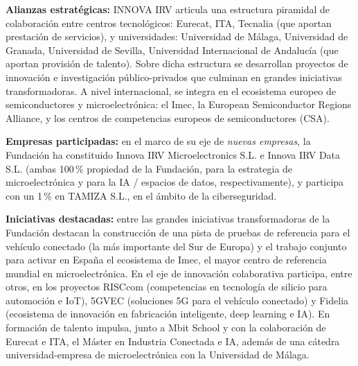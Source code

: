 \textbf{Alianzas estratégicas:} INNOVA IRV articula una estructura piramidal de colaboración entre centros tecnológicos: Eurecat, ITA, Tecnalia (que aportan prestación de servicios), y universidades: Universidad de Málaga, Universidad de Granada, Universidad de Sevilla, Universidad Internacional de Andalucía (que aportan provisión de talento). Sobre dicha estructura se desarrollan proyectos de innovación e investigación público-privados que culminan en grandes iniciativas transformadoras. A nivel internacional, se integra en el ecosistema europeo de semiconductores y microelectrónica: el Imec, la European Semiconductor Regions Alliance, y los centros de competencias europeos de semiconductores (CSA).

\textbf{Empresas participadas:} en el marco de su eje de \emph{nuevas empresas}, la Fundación ha constituido Innova IRV Microelectronics S.L. e Innova IRV Data S.L. (ambas 100\,\% propiedad de la Fundación, para la estrategia de microelectrónica y para la IA / espacios de datos, respectivamente), y participa con un 1\,\% en TAMIZA S.L., en el ámbito de la ciberseguridad.

\textbf{Iniciativas destacadas:} entre las grandes iniciativas transformadoras de la Fundación destacan la construcción de una pista de pruebas de referencia para el vehículo conectado (la más importante del Sur de Europa) y el trabajo conjunto para activar en España el ecosistema de Imec, el mayor centro de referencia mundial en microelectrónica. En el eje de innovación colaborativa participa, entre otros, en los proyectos RISCcom (competencias en tecnología de silicio para automoción e IoT), 5GVEC (soluciones 5G para el vehículo conectado) y Fidelia (ecosistema de innovación en fabricación inteligente, deep learning e IA). En formación de talento impulsa, junto a Mbit School y con la colaboración de Eurecat e ITA, el Máster en Industria Conectada e IA, además de una cátedra universidad-empresa de microelectrónica con la Universidad de Málaga.
